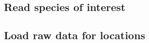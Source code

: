 \documentclass[]{article}
\newenvironment{Shaded}{}{}
\newcommand{\CommentTok}[1]{\textcolor[rgb]{0.38,0.63,0.69}{\textit{#1}}}
\newcommand{\KeywordTok}[1]{\textcolor[rgb]{0.00,0.44,0.13}{\textbf{#1}}}
\newcommand{\NormalTok}[1]{#1}
\newcommand{\OperatorTok}[1]{\textcolor[rgb]{0.40,0.40,0.40}{#1}}
\newcommand{\StringTok}[1]{\textcolor[rgb]{0.25,0.44,0.63}{#1}}
\begin{document}
\hypertarget{read-species-of-interest}{%
\subsection{Read species of interest}\label{read-species-of-interest}}

\begin{Shaded}
\end{Shaded}

\hypertarget{load-raw-data-for-locations}{%
\subsection{Load raw data for locations}\label{load-raw-data-for-locations}}
\end{document}
